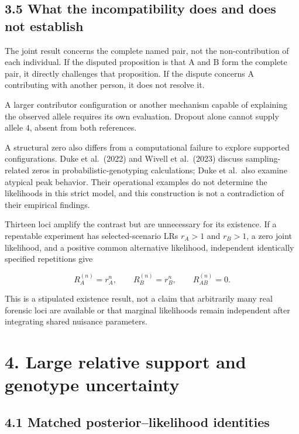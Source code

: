 \documentclass[
]{article}
\begin{document}
\subsection{3.5 What the incompatibility does and does not
establish}\label{what-the-incompatibility-does-and-does-not-establish}

The joint result concerns the complete named pair, not the
non-contribution of each individual. If the disputed proposition is that
A and B form the complete pair, it directly challenges that proposition.
If the dispute concerns A contributing with another person, it does not
resolve it.

A larger contributor configuration or another mechanism capable of
explaining the observed allele requires its own evaluation. Dropout
alone cannot supply allele \(4\), absent from both references.

A structural zero also differs from a computational failure to explore
supported configurations. Duke et al.~(2022) and Wivell et al.~(2023)
discuss sampling-related zeros in probabilistic-genotyping calculations;
Duke et al.~also examine atypical peak behavior. Their operational
examples do not determine the likelihoods in this strict model, and this
construction is not a contradiction of their empirical findings.

Thirteen loci amplify the contrast but are unnecessary for its
existence. If a repeatable experiment has selected-scenario LRs
\(r_A>1\) and \(r_B>1\), a zero joint likelihood, and a positive common
alternative likelihood, independent identically specified repetitions
give

\[
R_A^{(n)}=r_A^n,\qquad
R_B^{(n)}=r_B^n,\qquad
R_{AB}^{(n)}=0.
\]

This is a stipulated existence result, not a claim that arbitrarily many
real forensic loci are available or that marginal likelihoods remain
independent after integrating shared nuisance parameters.

\section{4. Large relative support and genotype
uncertainty}\label{large-relative-support-and-genotype-uncertainty}

\subsection{4.1 Matched posterior--likelihood
identities}\label{matched-posteriorlikelihood-identities}
\end{document}
